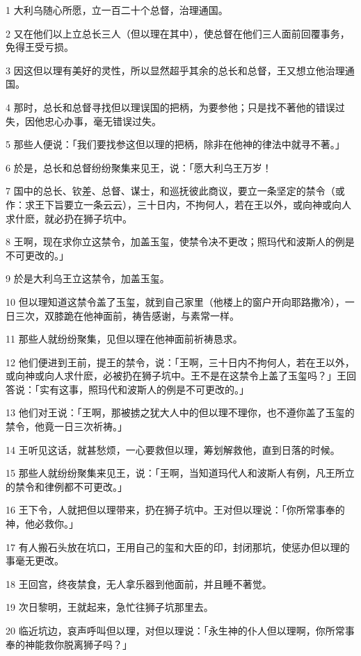 \par 1 大利乌随心所愿，立一百二十个总督，治理通国。
\par 2 又在他们以上立总长三人（但以理在其中），使总督在他们三人面前回覆事务，免得王受亏损。
\par 3 因这但以理有美好的灵性，所以显然超乎其余的总长和总督，王又想立他治理通国。
\par 4 那时，总长和总督寻找但以理误国的把柄，为要参他；只是找不著他的错误过失，因他忠心办事，毫无错误过失。
\par 5 那些人便说：「我们要找参这但以理的把柄，除非在他神的律法中就寻不著。」
\par 6 於是，总长和总督纷纷聚集来见王，说：「愿大利乌王万岁！
\par 7 国中的总长、钦差、总督、谋士，和巡抚彼此商议，要立一条坚定的禁令（或作：求王下旨要立一条云云），三十日内，不拘何人，若在王以外，或向神或向人求什麽，就必扔在狮子坑中。
\par 8 王啊，现在求你立这禁令，加盖玉玺，使禁令决不更改；照玛代和波斯人的例是不可更改的。」
\par 9 於是大利乌王立这禁令，加盖玉玺。
\par 10 但以理知道这禁令盖了玉玺，就到自己家里（他楼上的窗户开向耶路撒冷），一日三次，双膝跪在他神面前，祷告感谢，与素常一样。
\par 11 那些人就纷纷聚集，见但以理在他神面前祈祷恳求。
\par 12 他们便进到王前，提王的禁令，说：「王啊，三十日内不拘何人，若在王以外，或向神或向人求什麽，必被扔在狮子坑中。王不是在这禁令上盖了玉玺吗？」王回答说：「实有这事，照玛代和波斯人的例是不可更改的。」
\par 13 他们对王说：「王啊，那被掳之犹大人中的但以理不理你，也不遵你盖了玉玺的禁令，他竟一日三次祈祷。」
\par 14 王听见这话，就甚愁烦，一心要救但以理，筹划解救他，直到日落的时候。
\par 15 那些人就纷纷聚集来见王，说：「王啊，当知道玛代人和波斯人有例，凡王所立的禁令和律例都不可更改。」
\par 16 王下令，人就把但以理带来，扔在狮子坑中。王对但以理说：「你所常事奉的神，他必救你。」
\par 17 有人搬石头放在坑口，王用自己的玺和大臣的印，封闭那坑，使惩办但以理的事毫无更改。
\par 18 王回宫，终夜禁食，无人拿乐器到他面前，并且睡不著觉。
\par 19 次日黎明，王就起来，急忙往狮子坑那里去。
\par 20 临近坑边，哀声呼叫但以理，对但以理说：「永生神的仆人但以理啊，你所常事奉的神能救你脱离狮子吗？」
